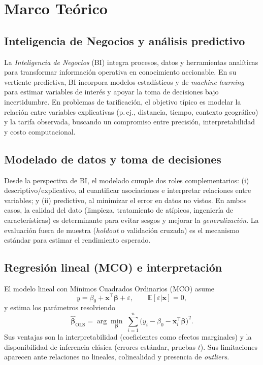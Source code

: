\documentclass[10pt]{article}
\begin{document}
	\section{Marco Teórico}
	\label{sec:marco-teorico}

	\subsection{Inteligencia de Negocios y análisis predictivo}
	La \textit{Inteligencia de Negocios} (BI) integra procesos, datos y herramientas analíticas para transformar información operativa en conocimiento accionable. En su vertiente predictiva, BI incorpora modelos estadísticos y de \textit{machine learning} para estimar variables de interés y apoyar la toma de decisiones bajo incertidumbre. En problemas de tarificación, el objetivo típico es modelar la relación entre variables explicativas (p.\,ej., distancia, tiempo, contexto geográfico) y la tarifa observada, buscando un compromiso entre precisión, interpretabilidad y costo computacional.

	\subsection{Modelado de datos y toma de decisiones}
	Desde la perspectiva de BI, el modelado cumple dos roles complementarios: (i) descriptivo/explicativo, al cuantificar asociaciones e interpretar relaciones entre variables; y (ii) predictivo, al minimizar el error en datos no vistos. En ambos casos, la calidad del dato (limpieza, tratamiento de atípicos, ingeniería de características) es determinante para evitar sesgos y mejorar la \textit{generalización}. La evaluación fuera de muestra (\textit{holdout} o validación cruzada) es el mecanismo estándar para estimar el rendimiento esperado.

	\subsection{Regresión lineal (MCO) e interpretación}
	El modelo lineal con Mínimos Cuadrados Ordinarios (MCO) asume
	\[
	y = \beta_0 + \mathbf{x}^\top\boldsymbol{\beta} + \varepsilon,\qquad \mathbb{E}[\varepsilon|\mathbf{x}]=0,
	\]
	y estima los parámetros resolviendo
	\[
	\hat{\boldsymbol{\beta}}_{\text{OLS}}
	= \arg\min_{\boldsymbol{\beta}} \; \sum_{i=1}^{n}\bigl(y_i - \beta_0 - \mathbf{x}_i^\top\boldsymbol{\beta}\bigr)^2.
	\]
	Sus ventajas son la interpretabilidad (coeficientes como efectos marginales) y la disponibilidad de inferencia clásica (errores estándar, pruebas $t$). Sus limitaciones aparecen ante relaciones no lineales, colinealidad y presencia de \textit{outliers}.
\end{document}
